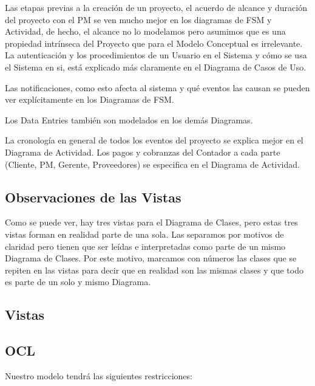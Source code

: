Las etapas previas a la creación de un proyecto, el acuerdo de alcance y duración del proyecto con el PM se ven mucho mejor en los diagramas de FSM y Actividad, de hecho, el alcance no lo modelamos pero asumimos que es una propiedad intrínseca del Proyecto que para el Modelo Conceptual es irrelevante.
La autenticación y los procedimientos de un Usuario en el Sistema y cómo se usa el Sistema en si, está explicado más claramente en el Diagrama de Casos de Uso.

Las notificaciones, como esto afecta al sistema y qué eventos las causan se pueden ver explícitamente en los Diagramas de FSM. 

Los Data Entries también son modelados en los demás Diagramas. 

La cronología en general de todos los eventos del proyecto se explica mejor en el Diagrama de Actividad.
Los pagos y cobranzas del Contador a cada parte (Cliente, PM, Gerente, Proveedores) se especifica en el Diagrama de Actividad.

\subsection{Observaciones de las Vistas}
Como se puede ver, hay tres vistas para el Diagrama de Clases, pero estas tres vistas forman en realidad parte de una sola. Las separamos por motivos de claridad pero tienen que ser leídas e interpretadas como parte de un mismo Diagrama de Clases. Por este motivo, marcamos con números las clases que se repiten en las vistas para decir que en realidad son las mismas clases y que todo es parte de un solo y mismo Diagrama.

\subsection{Vistas}

\subsection{OCL}
Nuestro modelo tendrá las siguientes restricciones: